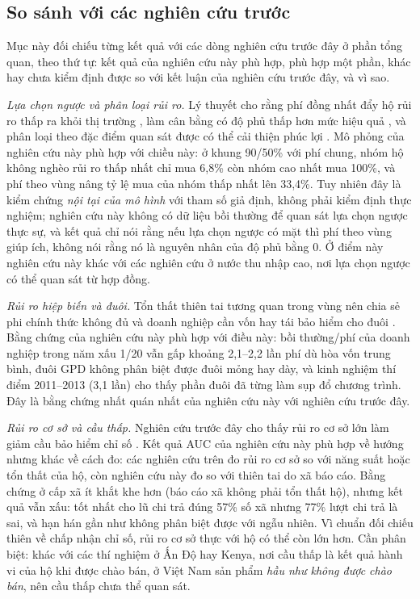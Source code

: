\documentclass[12pt,a4paper]{article}
\begin{document}
\subsection{So sánh với các nghiên cứu trước}

Mục này đối chiếu từng kết quả với các dòng nghiên cứu trước đây ở phần tổng quan, theo thứ tự: kết quả của nghiên cứu này phù hợp, phù hợp một phần, khác hay chưa kiểm định được so với kết luận của nghiên cứu trước đây, và vì sao.

\textit{Lựa chọn ngược và phân loại rủi ro.} Lý thuyết cho rằng phí đồng nhất đẩy hộ rủi ro thấp ra khỏi thị trường \parencite{akerlof1970,rothschild1976}, làm cân bằng có độ phủ thấp hơn mức hiệu quả \parencite{einav2011}, và phân loại theo đặc điểm quan sát được có thể cải thiện phúc lợi \parencite{crocker1986}. Mô phỏng của nghiên cứu này phù hợp với chiều này: ở khung 90/50\% với phí chung, nhóm hộ không nghèo rủi ro thấp nhất chỉ mua 6,8\% còn nhóm cao nhất mua 100\%, và phí theo vùng nâng tỷ lệ mua của nhóm thấp nhất lên 33,4\%. Tuy nhiên đây là kiểm chứng \emph{nội tại của mô hình} với tham số giả định, không phải kiểm định thực nghiệm; nghiên cứu này không có dữ liệu bồi thường để quan sát lựa chọn ngược thực sự, và kết quả chỉ nói rằng nếu lựa chọn ngược có mặt thì phí theo vùng giúp ích, không nói rằng nó là nguyên nhân của độ phủ bằng 0. Ở điểm này nghiên cứu này khác với các nghiên cứu ở nước thu nhập cao, nơi lựa chọn ngược có thể quan sát từ hợp đồng.

\textit{Rủi ro hiệp biến và đuôi.} Tổn thất thiên tai tương quan trong vùng nên chia sẻ phi chính thức không đủ \parencite{townsend1994,dercon2002} và doanh nghiệp cần vốn hay tái bảo hiểm cho đuôi \parencite{kunreuther1996}. Bằng chứng của nghiên cứu này phù hợp với điều này: bồi thường/phí của doanh nghiệp trong năm xấu 1/20 vẫn gấp khoảng 2,1--2,2 lần phí dù hòa vốn trung bình, đuôi GPD không phân biệt được đuôi mỏng hay dày, và kinh nghiệm thí điểm 2011--2013 (3,1 lần) cho thấy phần đuôi đã từng làm sụp đổ chương trình. Đây là bằng chứng nhất quán nhất của nghiên cứu này với nghiên cứu trước đây.

\textit{Rủi ro cơ sở và cầu thấp.} Nghiên cứu trước đây cho thấy rủi ro cơ sở lớn làm giảm cầu bảo hiểm chỉ số \parencite{gine2008,clarke2016,jensen2016}. Kết quả AUC của nghiên cứu này phù hợp về hướng nhưng khác về cách đo: các nghiên cứu trên đo rủi ro cơ sở so với năng suất hoặc tổn thất của hộ, còn nghiên cứu này đo so với thiên tai do xã báo cáo. Bằng chứng ở cấp xã ít khắt khe hơn (báo cáo xã không phải tổn thất hộ), nhưng kết quả vẫn xấu: tốt nhất cho lũ chi trả đúng 57\% số xã nhưng 77\% lượt chi trả là sai, và hạn hán gần như không phân biệt được với ngẫu nhiên. Vì chuẩn đối chiếu thiên về chấp nhận chỉ số, rủi ro cơ sở thực với hộ có thể còn lớn hơn. Cần phân biệt: khác với các thí nghiệm ở Ấn Độ hay Kenya, nơi cầu thấp là kết quả hành vi của hộ khi được chào bán, ở Việt Nam sản phẩm \emph{hầu như không được chào bán}, nên cầu thấp chưa thể quan sát.
\end{document}
